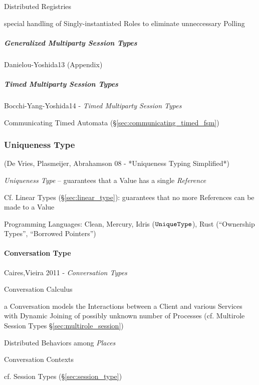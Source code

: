 Distributed Registries

special handling of Singly-instantiated Roles to eliminate
unneccessary Polling



\subparagraph{Generalized Multiparty Session Types}
\label{sec:generalized_multiparty}\hfill

Danielou-Yoshida13 (Appendix)



\subparagraph{Timed Multiparty Session Types}
\label{sec:timed_multiparty}\hfill

Bocchi-Yang-Yoshida14 - \emph{Timed Multiparty Session Types}

Communicating Timed Automata (\S\ref{sec:communicating_timed_fsm})



\subsubsection{Uniqueness Type}\label{sec:uniqueness_type}

(De Vries, Plasmeijer, Abrahamson 08 - *Uniqueness Typing Simplified*)

\emph{Uniqueness Type} -- guarantees that a Value has a single
\emph{Reference}

\fist Cf. Linear Types (\S\ref{sec:linear_type}): guarantees that no
more References can be made to a Value

Programming Languages: Clean, Mercury, Idris ($\mathtt{UniqueType}$), Rust
(``Ownership Types'', ``Borrowed Pointers'')



\paragraph{Conversation Type}\label{sec:conversation_type}\hfill

Caires,Vieira 2011 - \emph{Conversation Types}


Conversation Calculus

a Conversation models the Interactions between a Client and various
Services with Dynamic Joining of possibly unknown number of Processes
(\fist cf. Multirole Session Types \S\ref{sec:multirole_session})

Distributed Behaviors among \emph{Places}

Conversation Contexts

\fist cf. Session Types (\S\ref{sec:session_type})



